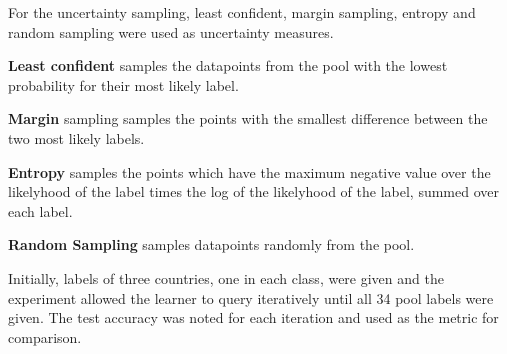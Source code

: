 \documentclass[12pt,fleqn]{article}
\begin{document}
\begin{multicols}{2}
	For the uncertainty sampling, least confident, margin sampling, entropy and random sampling were used as uncertainty measures.
	

	\begin{compactitem}
		\item \textbf{Least confident} samples the datapoints from the pool with the lowest probability for their most likely label.
		\item \textbf{Margin} sampling samples the points with the smallest difference between the two most likely labels.
		\item \textbf{Entropy} samples the points which have the maximum negative value over the likelyhood of the label times the log of the likelyhood of the label, summed over each label.
		\item \textbf{Random Sampling} samples datapoints randomly from the pool.
	\end{compactitem}
		Initially, labels of three countries, one in each class, were given and the experiment allowed the learner to query iteratively until all 34 pool labels were given. The test accuracy was noted for each iteration and used as the metric for comparison.
\end{multicols}		
\end{document}
